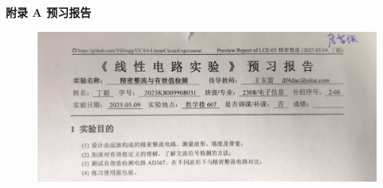 \documentclass[UTF8]{article}
\begin{document}
\newpage
\newpage
\vspace*{\fill}\begin{center}\Huge{\bfseries 
    附录 A\hspace*{20pt} 预习报告
}\end{center} 
\begin{figure}[H]\centering
    \includegraphics[width=\columnwidth]{LCE-05-精密整流/assets/appendix/image.png}
\end{figure}
\vspace*{\fill}
\thispagestyle{fancy} 




\end{document}
